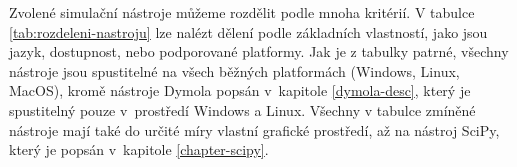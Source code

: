 Zvolené simulační nástroje můžeme rozdělit podle mnoha kritérií. V tabulce \ref{tab:rozdeleni-nastroju} lze nalézt dělení podle základních vlastností, jako jsou jazyk, dostupnost, nebo podporované platformy. Jak je z tabulky patrné, všechny nástroje jsou spustitelné na všech běžných platformách (Windows, Linux, MacOS), kromě nástroje Dymola popsán v~kapitole \ref{dymola-desc}, který je spustitelný pouze v~prostředí Windows a Linux. Všechny v tabulce zmíněné nástroje mají také do určité míry vlastní grafické prostředí, až na nástroj SciPy, který je popsán v~kapitole \ref{chapter-scipy}. 
\begin{savenotes}
\begin{table}[]
\centering
{}
\end{table}
\end{savenotes}
